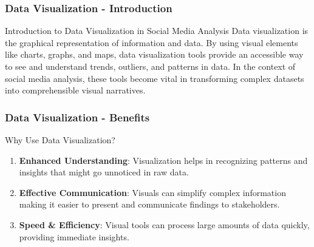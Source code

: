 \documentclass{beamer}
\begin{document}
\begin{frame}[fragile]
    \frametitle{Data Visualization - Introduction}
    \begin{block}{Introduction to Data Visualization in Social Media Analysis}
        Data visualization is the graphical representation of information and data. By using visual elements like charts, graphs, and maps, data visualization tools provide an accessible way to see and understand trends, outliers, and patterns in data. In the context of social media analysis, these tools become vital in transforming complex datasets into comprehensible visual narratives.
    \end{block}
\end{frame}

\begin{frame}[fragile]
    \frametitle{Data Visualization - Benefits}
    \begin{block}{Why Use Data Visualization?}   
        \begin{enumerate}
            \item \textbf{Enhanced Understanding}: Visualization helps in recognizing patterns and insights that might go unnoticed in raw data.
            \item \textbf{Effective Communication}: Visuals can simplify complex information making it easier to present and communicate findings to stakeholders.
            \item \textbf{Speed \& Efficiency}: Visual tools can process large amounts of data quickly, providing immediate insights.
        \end{enumerate}
    \end{block}
\end{frame}
\end{document}
